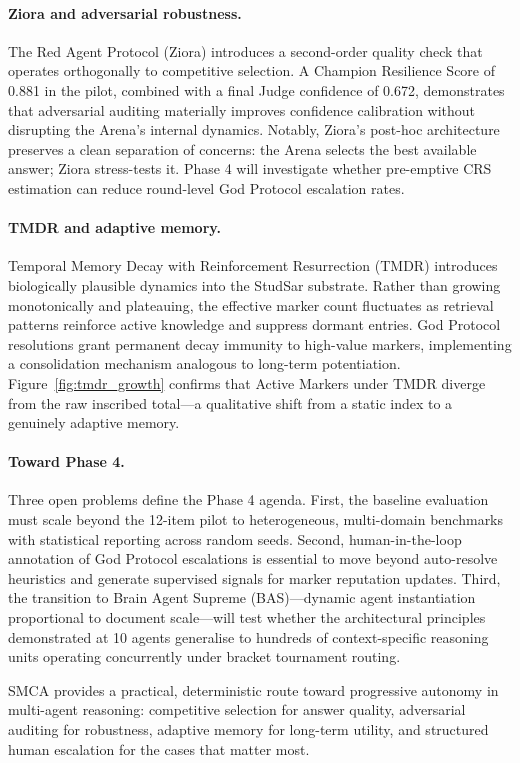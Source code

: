 \documentclass[11pt, a4paper]{article}
\begin{document}
\paragraph{Ziora and adversarial robustness.}
The Red Agent Protocol (Ziora) introduces a second-order quality check that operates orthogonally to competitive selection. A Champion Resilience Score of 0.881 in the pilot, combined with a final Judge confidence of 0.672, demonstrates that adversarial auditing materially improves confidence calibration without disrupting the Arena's internal dynamics. Notably, Ziora's post-hoc architecture preserves a clean separation of concerns: the Arena selects the best available answer; Ziora stress-tests it. Phase 4 will investigate whether pre-emptive CRS estimation can reduce round-level God Protocol escalation rates.

\paragraph{TMDR and adaptive memory.}
Temporal Memory Decay with Reinforcement Resurrection (TMDR) introduces biologically plausible dynamics into the StudSar substrate. Rather than growing monotonically and plateauing, the effective marker count fluctuates as retrieval patterns reinforce active knowledge and suppress dormant entries. God Protocol resolutions grant permanent decay immunity to high-value markers, implementing a consolidation mechanism analogous to long-term potentiation. Figure~\ref{fig:tmdr_growth} confirms that Active Markers under TMDR diverge from the raw inscribed total---a qualitative shift from a static index to a genuinely adaptive memory.

\paragraph{Toward Phase 4.}
Three open problems define the Phase 4 agenda. First, the baseline evaluation must scale beyond the 12-item pilot to heterogeneous, multi-domain benchmarks with statistical reporting across random seeds. Second, human-in-the-loop annotation of God Protocol escalations is essential to move beyond auto-resolve heuristics and generate supervised signals for marker reputation updates. Third, the transition to Brain Agent Supreme (BAS)---dynamic agent instantiation proportional to document scale---will test whether the architectural principles demonstrated at 10 agents generalise to hundreds of context-specific reasoning units operating concurrently under bracket tournament routing.

SMCA provides a practical, deterministic route toward progressive autonomy in multi-agent reasoning: competitive selection for answer quality, adversarial auditing for robustness, adaptive memory for long-term utility, and structured human escalation for the cases that matter most.
\end{document}
